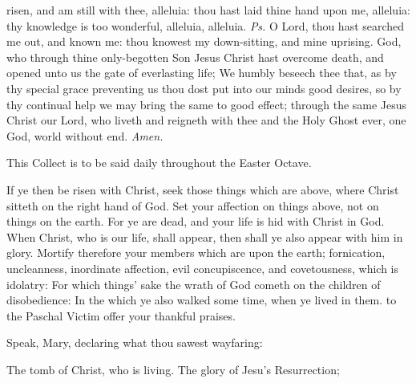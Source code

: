 \introit
{} risen, and am still with thee, alleluia: thou hast laid thine hand upon me, alleluia: thy knowledge is too wonderful, alleluia, alleluia. \textit{Ps.} O Lord, thou hast searched me out, and known me: thou knowest my down-sitting, and mine uprising.
\collect\label{EasterCollect}
 God, who through thine only-begotten Son Jesus Christ hast overcome death, and opened unto us the gate of everlasting life; We humbly beseech thee that, as by thy special grace preventing us thou dost put into our minds good desires, so by thy continual help we may bring the same to good effect; through the same Jesus Christ our Lord, who liveth and reigneth with thee and the Holy Ghost ever, one God, world without end. \textit{Amen.}
\begin{rubric}
    This Collect is to be said daily throughout the Easter Octave.
\end{rubric}
 If ye then be risen with Christ, seek those things which are above, where Christ sitteth on the right hand of God. Set your affection on things above, not on things on the earth. For ye are dead, and your life is hid with Christ in God. When Christ, who is our life, shall appear, then shall ye also appear with him in glory. Mortify therefore your members which are upon the earth; fornication, uncleanness, inordinate affection, evil concupiscence, and covetousness, which is idolatry: For which things' sake the wrath of God cometh on the children of disobedience: In the which ye also walked some time, when ye lived in them.
\label{PaschalSequence}
 to the Paschal Victim offer your thankful praises.\par
{}
Speak, Mary, declaring what thou sawest wayfaring:\par
The tomb of Christ, who is living. The glory of Jesu's Resurrection;\par
